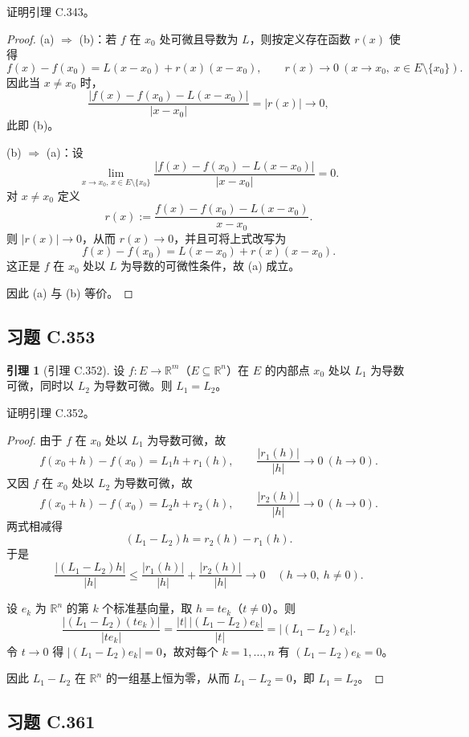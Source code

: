 \documentclass[11pt,a4paper]{article}
\newcommand{\R}{\mathbb{R}}
\theoremstyle{definition}
\newtheorem{lemma}[theorem]{引理}
\begin{document}
证明引理 C.343。

\begin{proof}
(a) $\Rightarrow$ (b)：若 $f$ 在 $x_0$ 处可微且导数为 $L$，则按定义存在函数 $r(x)$ 使得
\[
  f(x)-f(x_0)=L(x-x_0)+r(x)(x-x_0),
  \qquad r(x)\to 0 \ (x\to x_0,\ x\in E\setminus\{x_0\}).
\]
因此当 $x\neq x_0$ 时，
\[
  \frac{|f(x)-f(x_0)-L(x-x_0)|}{|x-x_0|}=|r(x)|\to 0,
\]
此即 (b)。

(b) $\Rightarrow$ (a)：设
\[
  \lim_{x\to x_0,\,x\in E\setminus\{x_0\}}
  \frac{|f(x)-f(x_0)-L(x-x_0)|}{|x-x_0|}=0.
\]
对 $x\neq x_0$ 定义
\[
  r(x):=\frac{f(x)-f(x_0)-L(x-x_0)}{x-x_0}.
\]
则 $|r(x)|\to 0$，从而 $r(x)\to 0$，并且可将上式改写为
\[
  f(x)-f(x_0)=L(x-x_0)+r(x)(x-x_0).
\]
这正是 $f$ 在 $x_0$ 处以 $L$ 为导数的可微性条件，故 (a) 成立。

因此 (a) 与 (b) 等价。
\end{proof}

\subsection{习题 C.353}

\begin{lemma}[引理 C.352]
  设 $f : E \to \R^m$（$E \subseteq \R^n$）在 $E$ 的内部点 $x_0$ 处以 $L_1$ 为导数可微，同时以 $L_2$ 为导数可微。则 $L_1=L_2$。
\end{lemma}

证明引理 C.352。

\begin{proof}
由于 $f$ 在 $x_0$ 处以 $L_1$ 为导数可微，故
\[
  f(x_0+h)-f(x_0)=L_1h+r_1(h),
  \qquad \frac{|r_1(h)|}{|h|}\to 0 \ (h\to 0).
\]
又因 $f$ 在 $x_0$ 处以 $L_2$ 为导数可微，故
\[
  f(x_0+h)-f(x_0)=L_2h+r_2(h),
  \qquad \frac{|r_2(h)|}{|h|}\to 0 \ (h\to 0).
\]
两式相减得
\[
  (L_1-L_2)h=r_2(h)-r_1(h).
\]
于是
\[
  \frac{|(L_1-L_2)h|}{|h|}
  \le
  \frac{|r_1(h)|}{|h|}+\frac{|r_2(h)|}{|h|}
  \to 0
  \quad (h\to 0,\ h\neq 0).
\]

设 $e_k$ 为 $\R^n$ 的第 $k$ 个标准基向量，取 $h=t e_k$（$t\neq 0$）。则
\[
  \frac{|(L_1-L_2)(t e_k)|}{|t e_k|}
  = \frac{|t|\,|(L_1-L_2)e_k|}{|t|}
  = |(L_1-L_2)e_k|.
\]
令 $t\to 0$ 得 $|(L_1-L_2)e_k|=0$，故对每个 $k=1,\dots,n$ 有 $(L_1-L_2)e_k=0$。

因此 $L_1-L_2$ 在 $\R^n$ 的一组基上恒为零，从而 $L_1-L_2=0$，即 $L_1=L_2$。
\end{proof}

\subsection{习题 C.361}
\end{document}

